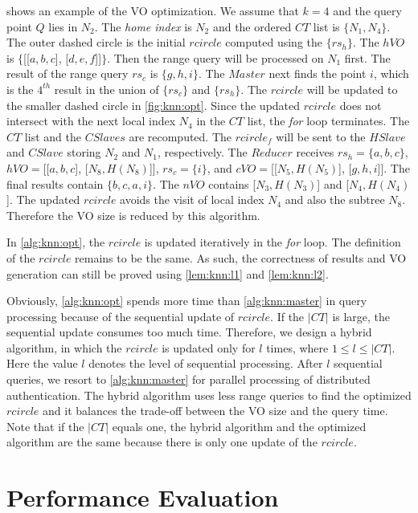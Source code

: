  shows an example of the VO optimization. We assume that $k=4$ and the query point $Q$ lies in $N_{2}$. The \emph{home index} is $N_{2}$ and the ordered $CT$ list is $\{N_{1}, N_{4}\}$. The outer dashed circle is the initial $rcircle$ computed using the $\{rs_{h}\}$. The $hVO$ is $\{$[[$a, b, c$], [$d, e, f$]]$\}$. Then the range query will be processed on $N_{1}$ first. The result of the range query $rs_{c}$ is $\{g, h, i\}$. The $Master$ next finds the point $i$, which is the $4^{th}$ result in the union of $\{rs_{c}\}$ and $\{rs_{h}\}$. The $rcircle$ will be updated to the smaller dashed circle in \cref{fig:knn:opt}. Since the updated $rcircle$ does not intersect with the next local index $N_{4}$ in the $CT$ list, the \emph{for} loop terminates. The $CT$ list and the $CSlaves$ are recomputed. The $rcircle_{f}$ will be sent to the $HSlave$ and $CSlave$ storing $N_{2}$ and $N_{1}$, respectively. The $Reducer$ receives $rs_{h} = \{a, b, c\}$, $hVO= $[[$a, b, c$], [$N_{8}, H(N_{8})$]], $rs_{c} = \{i\}$, and $cVO =$[[$N_{5}, H(N_{5})$], [$g, h, i$]]. The final results contain $\{b, c, a, i\}$. The $nVO$ contains [$N_{3}, H(N_{3})$] and [$N_{4}, H(N_{4})$]. The updated $rcircle$ avoids the visit of local index $N_{4}$ and also the subtree $N_{8}$. Therefore the VO size is reduced by this algorithm.

In \cref{alg:knn:opt}, the $rcircle$ is updated iteratively in the \emph{for} loop. The definition of the $rcircle$ remains to be the same. As such, the correctness of results and VO generation can still be proved using \cref{lem:knn:l1} and \cref{lem:knn:l2}.

Obviously, \cref{alg:knn:opt} spends more time than \cref{alg:knn:master} in query processing because of the sequential update of $rcircle$. If the $|CT|$ is large, the sequential update consumes too much time. Therefore, we design a hybrid algorithm, in which the $rcircle$ is updated only for $l$ times, where $1\le l \le |CT|$. Here the value $l$ denotes the level of sequential processing. After $l$ sequential queries, we resort to \cref{alg:knn:master} for parallel processing of distributed authentication. The hybrid algorithm uses less range queries to find the optimized $rcircle$ and it balances the trade-off between the VO size and the query time. Note that if the $|CT|$ equals one, the hybrid algorithm and the optimized algorithm are the same because there is only one update of the $rcircle$.

\section{Performance Evaluation}\label{sec:knn:exp}


